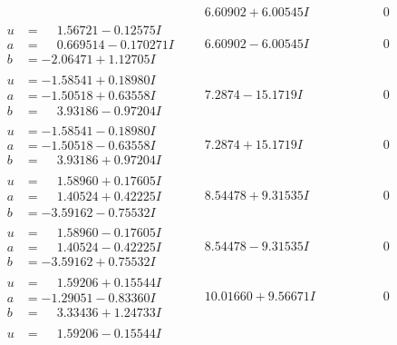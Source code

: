 \documentclass[1p]{elsarticle_modified}
\theoremstyle{definition}
\begin{document}
$$\begin{array}{c|c|c}
 & \phantom{-}6.60902 + 6.00545 I & \phantom{-0.000000 } 0 \\ \hline\begin{aligned}
u &= \phantom{-}1.56721 - 0.12575 I \\
a &= \phantom{-}0.669514 - 0.170271 I \\
b &= -2.06471 + 1.12705 I\end{aligned}
 & \phantom{-}6.60902 - 6.00545 I & \phantom{-0.000000 } 0 \\ \hline\begin{aligned}
u &= -1.58541 + 0.18980 I \\
a &= -1.50518 + 0.63558 I \\
b &= \phantom{-}3.93186 - 0.97204 I\end{aligned}
 & \phantom{-}7.2874 - 15.1719 I & \phantom{-0.000000 } 0 \\ \hline\begin{aligned}
u &= -1.58541 - 0.18980 I \\
a &= -1.50518 - 0.63558 I \\
b &= \phantom{-}3.93186 + 0.97204 I\end{aligned}
 & \phantom{-}7.2874 + 15.1719 I & \phantom{-0.000000 } 0 \\ \hline\begin{aligned}
u &= \phantom{-}1.58960 + 0.17605 I \\
a &= \phantom{-}1.40524 + 0.42225 I \\
b &= -3.59162 - 0.75532 I\end{aligned}
 & \phantom{-}8.54478 + 9.31535 I & \phantom{-0.000000 } 0 \\ \hline\begin{aligned}
u &= \phantom{-}1.58960 - 0.17605 I \\
a &= \phantom{-}1.40524 - 0.42225 I \\
b &= -3.59162 + 0.75532 I\end{aligned}
 & \phantom{-}8.54478 - 9.31535 I & \phantom{-0.000000 } 0 \\ \hline\begin{aligned}
u &= \phantom{-}1.59206 + 0.15544 I \\
a &= -1.29051 - 0.83360 I \\
b &= \phantom{-}3.33436 + 1.24733 I\end{aligned}
 & \phantom{-}10.01660 + 9.56671 I & \phantom{-0.000000 } 0 \\ \hline\begin{aligned}
u &= \phantom{-}1.59206 - 0.15544 I \\

\end{aligned}
\end{array}$$
\end{document}
